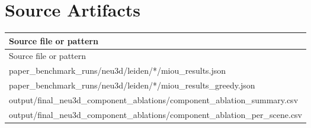 \documentclass[10pt]{article}
\begin{document}
\section{Source Artifacts}
\small
\begin{longtable}{p{15cm}}
\toprule
Source file or pattern \\
\midrule
\endfirsthead
\toprule
Source file or pattern \\
\midrule
\endhead
paper\_benchmark\_runs/neu3d/leiden/*/miou\_results.json \\
paper\_benchmark\_runs/neu3d/leiden/*/miou\_results\_greedy.json \\
output/final\_neu3d\_component\_ablations/component\_ablation\_summary.csv \\
output/final\_neu3d\_component\_ablations/component\_ablation\_per\_scene.csv \\
\bottomrule
\end{longtable}
\normalsize
\end{document}
